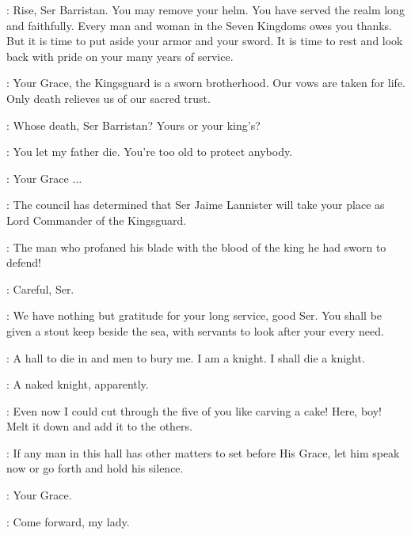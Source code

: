 \CERSEI: Rise, Ser Barristan. You may remove your helm.  You have served the realm long and faithfully. Every man and woman in the Seven Kingdoms owes you thanks. But it is time to put aside your armor and your sword. It is time to rest and look back with pride on your many years of service. 

\SELMY: Your Grace, the Kingsguard is a sworn brotherhood. Our vows are taken for life. Only death relieves us of our sacred trust. 

\CERSEI: Whose death, Ser Barristan? Yours or your king's? 

\JOFFREY: You let my father die. You're too old to protect anybody. 

\SELMY: Your Grace $\ldots$ 

\CERSEI: The council has determined that Ser Jaime Lannister will take your place as Lord Commander of the Kingsguard.  

\SELMY: The man who profaned his blade with the blood of the king he had sworn to defend! 

\CERSEI: Careful, Ser. 

\VARYS: We have nothing but gratitude for your long service, good Ser. You shall be given a stout keep beside the sea, with servants to look after your every need. 

\SELMY: A hall to die in and men to bury me.  I am a knight. I shall die a knight. 

\LITTLEFINGER: A naked knight, apparently.


\SELMY:  Even now I could cut through the five of you like carving a cake! Here, boy!  Melt it down and add it to the others. 

\HERALD: If any man in this hall has other matters to set before His Grace, let him speak now or go forth and hold his silence. 

\SANSA: Your Grace. 

\JOFFREY: Come forward, my lady. 


